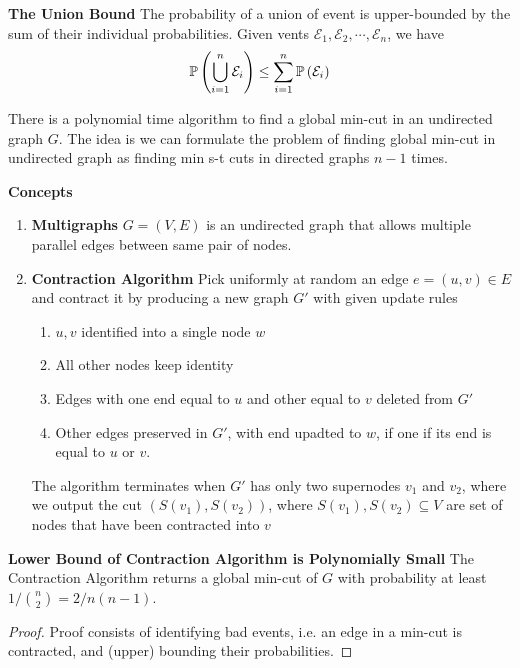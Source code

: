 \documentclass[11pt]{article}
\begin{document}
\begin{defn*}
    \textbf{The Union Bound} The probability of a union of event is upper-bounded by the sum of their individual probabilities. Given vents $\mathcal{E}_1, \mathcal{E}_2, \cdots, \mathcal{E}_n$, we have 
    \[
        \mathbb{P}\left( \bigcup_{i=1}^n \mathcal{E}_i  \right) \leq \sum_{i=1}^n \mathbb{P}\left( \mathcal{E}_i \right)
    \]
\end{defn*}




\begin{theorem*}
    There is a polynomial time algorithm to find a global min-cut in an undirected graph $G$. The idea is we can formulate the problem of finding global min-cut in undirected graph as finding min s-t cuts in directed graphs $n-1$ times.
\end{theorem*}


\begin{defn*}
    \textbf{Concepts}
    \begin{enumerate}
        \item \textbf{Multigraphs} $G=(V,E)$ is an undirected graph that allows multiple parallel edges between same pair of nodes.
        \item \textbf{Contraction Algorithm} Pick uniformly at random an edge $e = (u,v) \in E$ and contract it by producing a new graph $G'$ with given update rules
        \begin{enumerate}
            \item $u,v$ identified into a single node $w$
            \item All other nodes keep identity 
            \item Edges with one end equal to $u$ and other equal to $v$ deleted from $G'$
            \item Other edges preserved in $G'$, with end upadted to $w$, if one if its end is equal to $u$ or $v$.
        \end{enumerate}
        The algorithm terminates when $G'$ has only two supernodes $v_1$ and $v_2$, where we output the cut $(S(v_1), S(v_2))$, where $S(v_1), S(v_2)\subseteq V$ are set of nodes that have been contracted into $v$
    \end{enumerate}
\end{defn*}

\begin{theorem*}
    \textbf{Lower Bound of Contraction Algorithm is Polynomially Small} The Contraction Algorithm returns a global min-cut of $G$ with probability at least $1 / \binom{n}{2} = 2 / n(n-1)$.
    \begin{proof}
        Proof consists of identifying bad events, i.e. an edge in a min-cut is contracted, and (upper) bounding their probabilities.
    \end{proof}
\end{theorem*}
\end{document}
